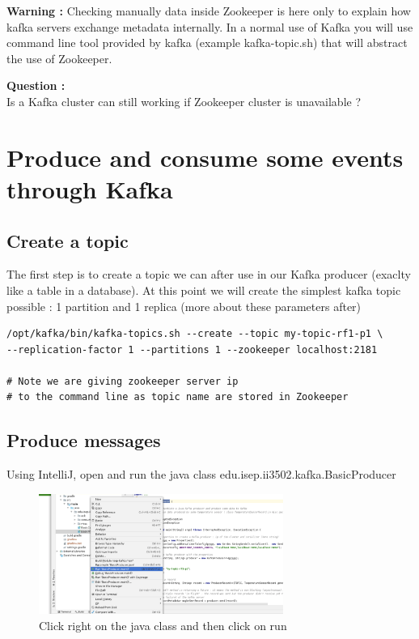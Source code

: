 \documentclass{article}
\newcounter{question}
\newenvironment{question}
    { \begin{mdframed}[backgroundcolor=gray!20] \textbf{Question \arabic{question} : } \stepcounter{question} \\}
    {  \end{mdframed}}
\newenvironment{warning}
    { \begin{mdframed}[backgroundcolor=blue!20] \textbf{Warning : } }
    {  \end{mdframed}}
\newenvironment{code}
    { \begin{mdframed} }    {  \end{mdframed}}
\begin{document}
\begin{warning}
Checking manually data inside Zookeeper is here only to explain how kafka servers exchange metadata internally. In a normal use of Kafka you will use command line tool provided by kafka (example kafka-topic.sh) that will abstract the use of Zookeeper.
\end{warning}

\begin{question}
  Is a Kafka cluster can still working if Zookeeper cluster is unavailable ?  
\end{question}


\section{Produce and consume some events through Kafka}
\subsection{Create a topic}
The first step is to create a topic we can after use in our Kafka producer (exaclty like a table in a database). At this point we will create the simplest kafka topic possible : 1 partition and 1 replica (more about these parameters after)

\begin{code}
    \begin{verbatim}
/opt/kafka/bin/kafka-topics.sh --create --topic my-topic-rf1-p1 \
--replication-factor 1 --partitions 1 --zookeeper localhost:2181

# Note we are giving zookeeper server ip
# to the command line as topic name are stored in Zookeeper
    \end{verbatim}
\end{code}
\subsection{Produce messages}
Using IntelliJ, open and run the java class edu.isep.ii3502.kafka.BasicProducer

\begin{figure}[H]
\includegraphics[width=8cm]{runJava.png}
\caption{Click right on the java class and then click on run}
\centering
\end{figure}
\end{document}
